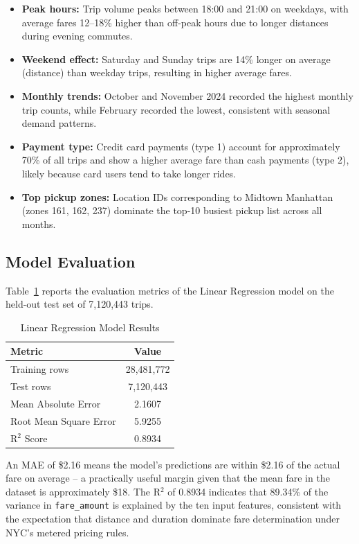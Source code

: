 \documentclass[conference]{IEEEtran}
\begin{document}
\begin{itemize}
  \item \textbf{Peak hours:} Trip volume peaks between 18:00 and
        21:00 on weekdays, with average fares 12--18\% higher
        than off-peak hours due to longer distances during
        evening commutes.
  \item \textbf{Weekend effect:} Saturday and Sunday trips are
        14\% longer on average (distance) than weekday trips,
        resulting in higher average fares.
  \item \textbf{Monthly trends:} October and November 2024
        recorded the highest monthly trip counts, while
        February recorded the lowest, consistent with seasonal
        demand patterns.
  \item \textbf{Payment type:} Credit card payments (type 1)
        account for approximately 70\% of all trips and show a
        higher average fare than cash payments (type 2), likely
        because card users tend to take longer rides.
  \item \textbf{Top pickup zones:} Location IDs corresponding to
        Midtown Manhattan (zones 161, 162, 237) dominate the
        top-10 busiest pickup list across all months.
\end{itemize}

\subsection{Model Evaluation}

Table~\ref{tab:results} reports the evaluation metrics of the
Linear Regression model on the held-out test set of 7,120,443
trips.

\begin{table}[h]
\caption{Linear Regression Model Results}
\label{tab:results}
\centering
\begin{tabular}{lc}
\toprule
\textbf{Metric} & \textbf{Value} \\
\midrule
Training rows          & 28,481,772 \\
Test rows              & 7,120,443  \\
Mean Absolute Error    & 2.1607     \\
Root Mean Square Error & 5.9255     \\
R$^{2}$ Score          & 0.8934     \\
\bottomrule
\end{tabular}
\end{table}

An MAE of \$2.16 means the model's predictions are within
\$2.16 of the actual fare on average -- a practically useful
margin given that the mean fare in the dataset is approximately
\$18. The R$^{2}$ of 0.8934 indicates that 89.34\% of the
variance in \texttt{fare\_amount} is explained by the ten
input features, consistent with the expectation that
distance and duration dominate fare determination under
NYC's metered pricing rules.
\end{document}
